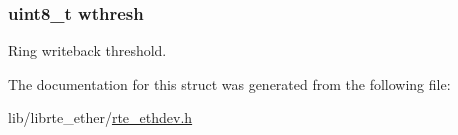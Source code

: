 \subsubsection[{wthresh}]{\setlength{\rightskip}{0pt plus 5cm}uint8\+\_\+t wthresh}\label{structrte__eth__thresh_aae1d4b493bdad178b16dc85edb2ab3ae}
Ring writeback threshold. 

The documentation for this struct was generated from the following file\+:\begin{DoxyCompactItemize}
\item 
lib/librte\+\_\+ether/\hyperlink{rte__ethdev_8h}{rte\+\_\+ethdev.\+h}\end{DoxyCompactItemize}
